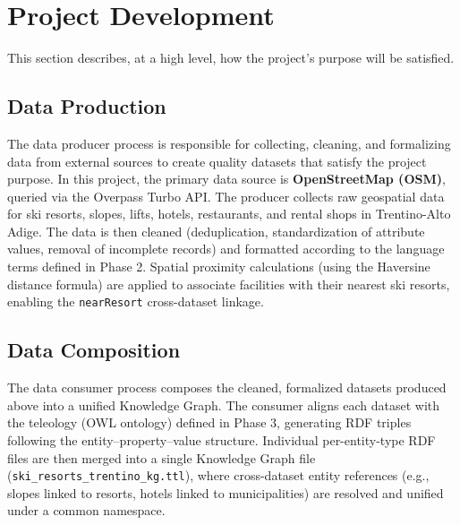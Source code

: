 \section{Project Development}
This section describes, at a high level, how the project's purpose will be satisfied.

\subsection{Data Production}
The data producer process is responsible for collecting, cleaning, and formalizing data from external sources to create quality datasets that satisfy the project purpose. In this project, the primary data source is \textbf{OpenStreetMap (OSM)}, queried via the Overpass Turbo API. The producer collects raw geospatial data for ski resorts, slopes, lifts, hotels, restaurants, and rental shops in Trentino-Alto Adige. The data is then cleaned (deduplication, standardization of attribute values, removal of incomplete records) and formatted according to the language terms defined in Phase 2. Spatial proximity calculations (using the Haversine distance formula) are applied to associate facilities with their nearest ski resorts, enabling the \texttt{nearResort} cross-dataset linkage.

\subsection{Data Composition}
The data consumer process composes the cleaned, formalized datasets produced above into a unified Knowledge Graph. The consumer aligns each dataset with the teleology (OWL ontology) defined in Phase 3, generating RDF triples following the entity--property--value structure. Individual per-entity-type RDF files are then merged into a single Knowledge Graph file (\texttt{ski\_resorts\_trentino\_kg.ttl}), where cross-dataset entity references (e.g., slopes linked to resorts, hotels linked to municipalities) are resolved and unified under a common namespace.
